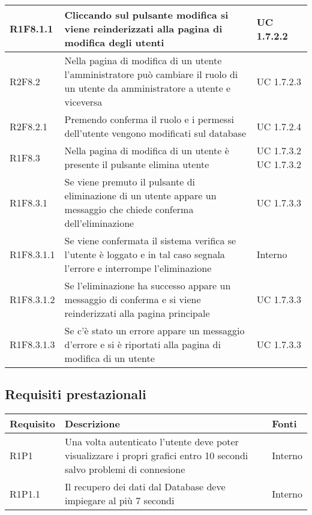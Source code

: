 \begin{center}
\begin{longtable}{| p{2cm} | p{8cm} | p{2cm} |}
		\hline
		R1F8.1.1  &  Cliccando sul pulsante modifica si viene reinderizzati alla pagina di modifica degli utenti  &  UC 1.7.2.2 \\
		\hline
		R2F8.2  &  Nella pagina di modifica di un utente l'amministratore può cambiare il ruolo di un utente da amministratore a utente e viceversa  &  UC 1.7.2.3 \\
		\hline
		R2F8.2.1  &  Premendo conferma il ruolo e i permessi dell'utente vengono modificati sul database  &  UC 1.7.2.4 \\
		\hline
		R1F8.3  &  Nella pagina di modifica di un utente è presente il pulsante elimina utente  & UC 1.7.3.2 \newline UC 1.7.3.2 \\
		\hline
		R1F8.3.1  &  Se viene premuto il pulsante di eliminazione di un utente appare un messaggio che chiede conferma dell'eliminazione  & UC 1.7.3.3\\
		\hline
		R1F8.3.1.1  &  Se viene confermata il sistema verifica se l'utente è loggato e in tal caso segnala l'errore e interrompe l'eliminazione  & Interno \\
		\hline
		R1F8.3.1.2  &  Se l'eliminazione ha successo appare un messaggio di conferma e si viene reinderizzati alla pagina principale  & UC 1.7.3.3\\
		\hline
		R1F8.3.1.3  &  Se c'è stato un errore appare un messaggio d'errore e si è riportati alla pagina di modifica di un utente  & UC 1.7.3.3\\
		\hline

	\end{longtable}
	\egroup
\end{center}


\subsection{Requisiti prestazionali}

\begin{center}

	\def\arraystretch{1.5}
	\bgroup
	\begin{longtable}{| p{2cm} | p{8cm} | p{2cm} |}

		\hline
		\textbf{Requisito} & \textbf{Descrizione} & \textbf{Fonti} \\
		\hline

		R1P1  &  Una volta autenticato l'utente deve poter visualizzare i propri grafici entro 10 secondi salvo problemi di connesione &  Interno \\
		\hline
		R1P1.1  &  Il recupero dei dati dal Database deve impiegare al più 7 secondi  &  Interno \\
		\hline

	\end{longtable}
	\egroup
\end{center}

